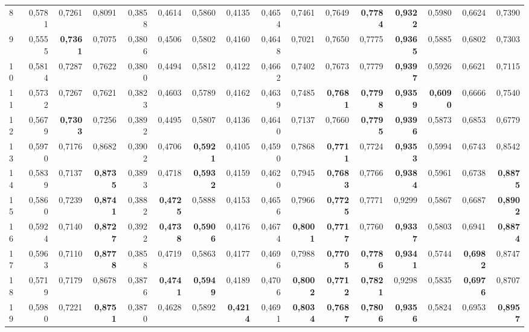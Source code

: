 \begin{table}[htp!]
\begin{adjustwidth}{-2cm}{}
\begin{tabular}{ l | *{15}{| r}}
8	&	0,5781	&	0,7261	&	0,8091	&	0,3858	&	0,4614	&	0,5860	&	0,4135	&	0,4654	&	0,7461	&	0,7649	&	\textbf{0,7784}	&	\textbf{0,9322}	&	0,5980	&	0,6624	&	0,7390	\\
9	&	0,5555	&	\textbf{0,7361}	&	0,7075	&	0,3806	&	0,4506	&	0,5802	&	0,4160	&	0,4648	&	0,7021	&	0,7650	&	0,7775	&	\textbf{0,9365}	&	0,5885	&	0,6802	&	0,7303	\\
10	&	0,5814	&	0,7287	&	0,7622	&	0,3800	&	0,4494	&	0,5812	&	0,4122	&	0,4662	&	0,7402	&	0,7673	&	0,7779	&	\textbf{0,9397}	&	0,5926	&	0,6621	&	0,7115	\\
11	&	0,5732	&	0,7267	&	0,7621	&	0,3823	&	0,4603	&	0,5789	&	0,4162	&	0,4639	&	0,7485	&	\textbf{0,7681}	&	\textbf{0,7798}	&	\textbf{0,9359}	&	\textbf{0,6090}	&	0,6666	&	0,7540	\\
12	&	0,5679	&	\textbf{0,7303}	&	0,7256	&	0,3892	&	0,4495	&	0,5807	&	0,4136	&	0,4640	&	0,7137	&	0,7660	&	\textbf{0,7795}	&	\textbf{0,9396}	&	0,5873	&	0,6853	&	0,6779	\\
13	&	0,5970	&	0,7176	&	0,8682	&	0,3902	&	0,4706	&	\textbf{0,5921}	&	0,4105	&	0,4590	&	0,7868	&	\textbf{0,7711}	&	0,7724	&	\textbf{0,9353}	&	0,5994	&	0,6743	&	0,8542	\\
14	&	0,5839	&	0,7137	&	\textbf{0,8735}	&	0,3893	&	0,4718	&	\textbf{0,5932}	&	0,4159	&	0,4620	&	0,7945	&	\textbf{0,7683}	&	0,7766	&	\textbf{0,9384}	&	0,5961	&	0,6738	&	\textbf{0,8875}	\\
15	&	0,5860	&	0,7239	&	\textbf{0,8741}	&	0,3882	&	\textbf{0,4725}	&	0,5888	&	0,4153	&	0,4656	&	0,7966	&	\textbf{0,7725}	&	0,7771	&	0,9299	&	0,5867	&	0,6687	&	\textbf{0,8902}	\\
16	&	0,5924	&	0,7140	&	\textbf{0,8727}	&	0,3922	&	\textbf{0,4738}	&	\textbf{0,5906}	&	0,4176	&	0,4674	&	\textbf{0,8001}	&	\textbf{0,7717}	&	0,7760	&	\textbf{0,9337}	&	0,5803	&	0,6941	&	\textbf{0,8874}	\\
17	&	0,5963	&	0,7110	&	\textbf{0,8778}	&	0,3858	&	0,4719	&	0,5863	&	0,4177	&	0,4696	&	0,7988	&	\textbf{0,7705}	&	\textbf{0,7786}	&	\textbf{0,9341}	&	0,5744	&	\textbf{0,6982}	&	0,8747	\\
18	&	0,5719	&	0,7179	&	0,8678	&	0,3876	&	\textbf{0,4741}	&	\textbf{0,5949}	&	0,4189	&	0,4706	&	\textbf{0,8002}	&	\textbf{0,7712}	&	\textbf{0,7821}	&	0,9298	&	0,5835	&	\textbf{0,6976}	&	0,8707	\\
19	&	0,5980	&	0,7221	&	\textbf{0,8751}	&	0,3870	&	0,4628	&	0,5892	&	\textbf{0,4214}	&	0,4691	&	\textbf{0,8034}	&	\textbf{0,7687}	&	\textbf{0,7806}	&	\textbf{0,9356}	&	0,5824	&	0,6953	&	\textbf{0,8957}	\\

\end{tabular}
\end{adjustwidth}
\end{table}

